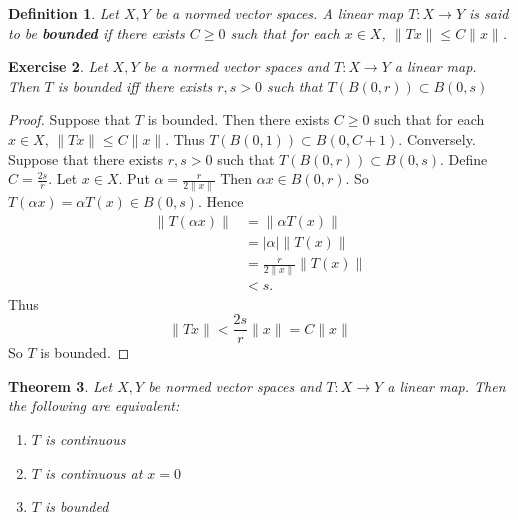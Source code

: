 \documentclass[12pt]{amsart}
\newtheorem{thm}{Theorem}[subsection]
\newtheorem{defn}[thm]{Definition}
\newtheorem{ex}[thm]{Exercise}
\newcommand{\al}{\alpha}
\begin{document}
	\begin{defn}
		Let $X,Y$ be a normed vector spaces. A linear map $T:X \rightarrow Y$ is said to be \textbf{bounded} if there exists $C \geq 0$ such that for each $x \in X$, $\|Tx \|\leq C \|x \|$.
	\end{defn}
	
	\begin{ex}
		Let $X,Y$ be a normed vector spaces and $T:X \rightarrow Y$ a linear map. Then $T$ is bounded iff there exists $r,s>0$ such that $T(B(0,r)) \subset B(0,s)$
	\end{ex}
	
	\begin{proof}
		Suppose that $T$ is bounded. Then there exists $C \geq 0$ such that for each $x \in X$, $\|Tx \|\leq C \|x \|$. Thus $T(B(0,1)) \subset B(0,C+1)$. Conversely. Suppose that there exists $r,s >0$ such that $T(B(0,r)) \subset B(0,s)$. Define $C = \frac{2s}{r}$. Let $x \in X$. Put $\al = \frac{r}{2\|x \|}$ Then $\al x \in B(0,r)$. So $T(\al x ) = \al T(x) \in B(0,s)$. Hence 
		\begin{align*}
			\|T(\al x) \|
			&= \|\al T(x) \|\\
			&= \vert \al \vert \|T(x) \|\\
			& = \frac{r}{2 \|x \|}  \|T(x) \|\\
			& < s.
		\end{align*}
		Thus $$\|Tx \|< \frac{2 s}{r} \|x \|= C \|x \|$$ So $T$ is bounded. 
	\end{proof}
	
	\begin{thm}
		Let $X,Y$ be normed vector spaces and $T:X \rightarrow Y$ a linear map. Then the following are equivalent:
		\begin{enumerate}
			\item $T$ is continuous
			\item $T$ is continuous at $x=0$
			\item $T$ is bounded
		\end{enumerate}
	\end{thm}
	
\end{document}
